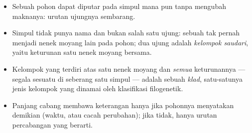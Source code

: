 \begin{proposition}\label{prop:g12:phylogenetic-trees:rules}
\begin{itemize}
  \item Sebuah pohon dapat diputar pada simpul mana pun tanpa mengubah
        maknanya: urutan ujungnya sembarang.
  \item Simpul tidak punya nama dan bukan salah satu ujung: sebuah
         tak pernah menjadi nenek moyang  lain pada
        pohon; dua ujung adalah \emph{kelompok saudari}, yaitu
        keturunan satu nenek moyang bersama.
  \item Kelompok yang terdiri atas satu nenek moyang dan \emph{semua}
        keturunannya --- segala sesuatu di seberang satu simpul ---
        adalah sebuah \emph{klad}, satu-satunya jenis
        kelompok yang dinamai oleh klasifikasi filogenetik.
  \item Panjang cabang membawa keterangan hanya jika pohonnya
        menyatakan demikian (waktu, atau cacah perubahan); jika tidak,
        hanya urutan percabangan yang berarti.
\end{itemize}
\end{proposition}
\admitted

